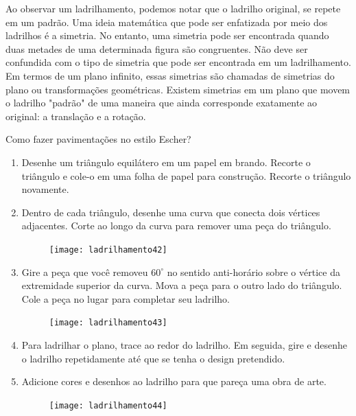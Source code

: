 Ao observar um ladrilhamento, podemos notar que o ladrilho original, se repete em um padrão. Uma ideia matemática que pode ser enfatizada por meio dos ladrilhos é a simetria. No entanto, uma simetria pode ser encontrada quando duas metades de uma determinada figura são congruentes. Não deve ser confundida com o tipo de simetria que pode ser encontrada em um ladrilhamento. Em termos de um plano infinito, essas simetrias são chamadas de simetrias do plano ou transformações geométricas. Existem simetrias em um plano que movem o ladrilho "padrão" de uma maneira que ainda corresponde exatamente ao original: a translação e a rotação.



\begin{task}{Como fazer pavimentações no estilo Escher?}
\begin{enumerate}
	\item Desenhe um triângulo equilátero em um papel em brando. Recorte o triângulo e cole-o em uma folha de papel para construção. Recorte o triângulo novamente.

	\item Dentro de cada triângulo, desenhe uma curva que conecta dois vértices adjacentes. Corte ao longo da curva para remover uma peça do triângulo.

	\begin{figure}[H]
	\centering
	\texttt{[image: ladrilhamento42]}

	\end{figure}

	\item Gire a peça que você removeu $60^{\circ}$ no sentido anti-horário sobre o vértice da extremidade superior da curva. Mova a peça para o outro lado do triângulo. Cole a peça no lugar para completar seu ladrilho.

	\begin{figure}[H]
	\centering
	\texttt{[image: ladrilhamento43]}

	\end{figure}

	\item Para ladrilhar o plano, trace ao redor do ladrilho. Em seguida, gire e desenhe o ladrilho repetidamente até que se tenha o design pretendido.
	\item Adicione cores e desenhos ao ladrilho para que pareça uma obra de arte.

	\begin{figure}[H]
	\centering
	\texttt{[image: ladrilhamento44]}


\end{figure}
\end{enumerate}
\end{task}
